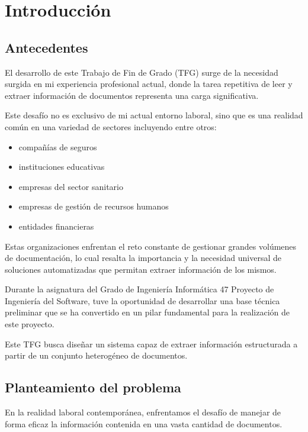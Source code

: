 \chapter{Introducción}\label{ch:chapter_1}


\section{Antecedentes}

El desarrollo de este Trabajo de Fin de Grado (TFG) surge de la necesidad surgida en mi experiencia profesional
actual, donde la tarea repetitiva de leer y extraer información de documentos representa una carga significativa.

Este desafío no es exclusivo de mi actual entorno laboral, sino que es una realidad común en una variedad de sectores
incluyendo entre otros:

\begin{itemize}
    \item compañías de seguros
    \item instituciones educativas
    \item empresas del sector sanitario
    \item empresas de gestión de recursos humanos
    \item entidades financieras
\end{itemize}

Estas organizaciones enfrentan el reto constante de gestionar grandes volúmenes de documentación, lo cual resalta la
importancia y la necesidad universal de soluciones automatizadas que permitan extraer información de los mismos.

Durante la asignatura del Grado de Ingeniería Informática 47 Proyecto de Ingeniería del Software, tuve la oportunidad de
desarrollar una base técnica preliminar que se ha convertido en un pilar fundamental para la realización de este
proyecto.

Este TFG busca diseñar un sistema capaz de extraer información estructurada a partir de un conjunto heterogéneo de
documentos.



\section{Planteamiento del problema}


En la realidad laboral contemporánea, enfrentamos el desafío de manejar de forma eficaz la información contenida en una
vasta cantidad de documentos.

